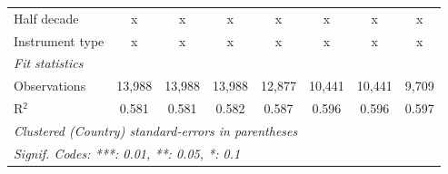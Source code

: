 \begin{tabular}{lccccccc}
   Half decade                                                                                      & x            & x            & x            & x            & x            & x            & x\\  
   Instrument type                                                                                  & x            & x            & x            & x            & x            & x            & x\\  
   \midrule \emph{Fit statistics}\\
   Observations                                                                                     & 13,988       & 13,988       & 13,988       & 12,877       & 10,441       & 10,441       & 9,709\\  
   R$^2$                                                                                            & 0.581        & 0.581        & 0.582        & 0.587        & 0.596        & 0.596        & 0.597\\  
   \midrule
   \multicolumn{8}{l}{\emph{Clustered (Country) standard-errors in parentheses}}\\
   \multicolumn{8}{l}{\emph{Signif. Codes: ***: 0.01, **: 0.05, *: 0.1}}\\
\end{tabular}
\par\endgroup


